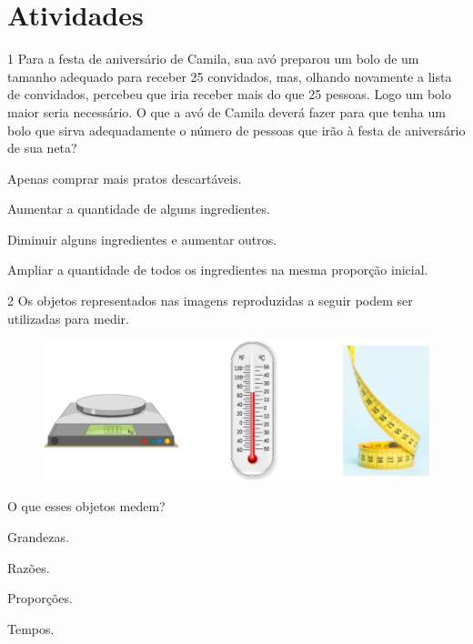 \section{Atividades}

\num{1} Para a festa de aniversário de Camila, sua avó preparou um bolo de um
tamanho adequado para receber 25 convidados, mas, olhando novamente a
lista de convidados, percebeu que iria receber mais do que 25 pessoas. Logo um bolo maior seria necessário.
O que a avó de Camila deverá fazer para que tenha um bolo que sirva
adequadamente o número de pessoas que irão à festa de aniversário de sua
neta?

\begin{escolha}
\item
  Apenas comprar mais pratos descartáveis.
\item
  Aumentar a quantidade de alguns ingredientes.
\item
  Diminuir alguns ingredientes e aumentar outros.
\item
  Ampliar a quantidade de todos os ingredientes na mesma proporção
  inicial.
\end{escolha}


\pagebreak
\num{2} Os objetos representados nas imagens reproduzidas a seguir podem ser utilizadas para medir.

\begin{figure}[htpb!]
\centering
\includegraphics[width=\textwidth]{media/image70.png}
\end{figure}

O que esses objetos medem?

\begin{minipage}{.5\textwidth}
\begin{escolha}
\item
  Grandezas.
\item
  Razões.
\item
  Proporções.
\item
  Tempos.
\end{escolha}
\end{minipage}


